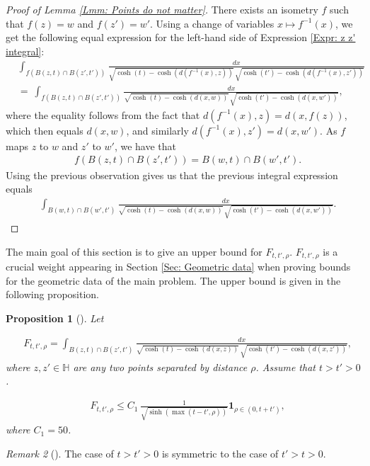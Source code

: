 \documentclass[11pt,twoside,reqno]{amsart} \usepackage{a4wide} \usepackage[T1]{fontenc} \usepackage[utf8]{inputenc} \usepackage{soul}  \usepackage{amsmath} \usepackage{amsfonts} \usepackage{amssymb} \usepackage{mathtools} \usepackage{amsthm} \usepackage{xcolor} \usepackage{graphicx} \usepackage{hyperref} \usepackage{standalone} \usepackage{esint} \usepackage{comment} \usepackage[left=2.3cm,top=3cm,right=2.3cm]{geometry} \usepackage{bm} \usepackage{svg} \usepackage{float} \numberwithin{equation}{section} \theoremstyle{plain} \newtheorem{thm}{Theorem}[section] \newtheorem{theorem}[thm]{Theorem} \newtheorem*{theorem*}{Theorem}\newtheorem{conj}[thm]{Conjecture} \newtheorem{lemma}[thm]{Lemma} \newtheorem{prop}[thm]{Proposition} \newtheorem{proposition}[thm]{Proposition} \newtheorem{cor}[thm]{Corollary} \newtheorem{question}[thm]{Question} \newtheorem{corollary}[thm]{Corollary} \newtheorem{assumption}[thm]{Assumption} \theoremstyle{definition} \newtheorem{defn}[thm]{Definition} \newtheorem{choice}[thm]{Choice} \newtheorem{definition}[thm]{Definition} \newtheorem{ex}[thm]{Example} \newtheorem{notation}[thm]{Notation} \newtheorem*{ack}{Acknowledgements} \theoremstyle{remark} \newtheorem{remark}[thm]{Remark} \newtheorem{bigremark}[thm]{Remark} \usepackage{xcolor} \newcommand{\red}[1]{ {\color{Red}#1} } \newcommand{\blue}[1]{ {\color{Blue}#1} } \author{Kai Hippi} \address{Aalto University, Espoo, Finland} \email{kai.hippi@aalto.fi}
\begin{document}
\begin{proof}[Proof of Lemma \ref{Lmm: Points do not matter}]

	There exists an isometry $ f $ such that $ f( z) = w $ and $ f( z' ) = w' $. Using a change of variables $ x \mapsto f^{-1}( x ) $, we get the following equal expression for the left-hand side of Expression \eqref{Expr: z z' integral}:
	\begin{align*}
		&
		\int_{ f\left( B( z,t ) \cap B( z',t' ) \right) } \frac{dx}{ \sqrt{ \cosh( t ) - \cosh( d( f^{-1}( x ), z ) ) } \, \sqrt{ \cosh( t' ) - \cosh( d( f^{-1}( x ), z' ) ) } }
		\\
		& = \
		\int_{ f\left( B( z,t ) \cap B( z',t' ) \right) } \frac{dx}{ \sqrt{ \cosh( t ) - \cosh( d( x, w ) ) } \, \sqrt{ \cosh( t' ) - \cosh( d( x, w' ) ) } },
	\end{align*}
	where the equality follows from the fact that $ d( f^{-1}( x ),z ) =  d( x, f( z ) ) $, which then equals $ d( x, w ) $, and similarly $ d( f^{-1}( x ),z' ) = d( x, w' ) $. As $ f $ maps $ z $ to $ w $ and $ z' $ to $ w' $, we have that
	\begin{align*}
		&
		f\left( B( z,t ) \cap B( z', t' ) \right) = B( w,t ) \cap B( w',t' ).
	\end{align*}
	Using the previous observation gives us that the previous integral expression equals
	\begin{align*}
		&
		\int_{ B( w,t ) \cap B( w', t' ) } \frac{dx}{ \sqrt{ \cosh( t ) - \cosh( d( x,w ) )  } \, \sqrt{ \cosh( t' ) - \cosh( d( x,w' ) ) } }.
	\end{align*}
	

\end{proof}


The main goal of this section is to give an upper bound for $ F_{t,t',\rho} $. $ F_{t,t',\rho} $ is a crucial weight appearing in Section \ref{Sec: Geometric data} when proving bounds for the geometric data of the main problem. The upper bound is given in the following proposition.

\begin{proposition}[]
	

	Let
	
	\begin{align*}
		&
		F_{t,t',\rho} = \int_{ B( z,t ) \cap B( z', t' ) } \frac{dx}{ \sqrt{ \cosh( t ) - \cosh( d( x,z ) )  } \, \sqrt{ \cosh( t' ) - \cosh( d( x,z' ) ) } },
\end{align*}
where $ z,z' \in \mathbb{H} $ are any two points separated by distance $ \rho $. Assume that $ t > t' > 0 $.
	
	\label{Prp: Weight function}
\begin{align*}
	&
	F_{t,t',\rho} \leq C_{1}  \, \frac{1}{\sqrt{ \sinh( \max( t-t', \rho ) ) }} \boldsymbol 1_{ \rho \in ( 0, t + t' ) },
\end{align*}
where $C_{1} = 50$.

\end{proposition}
\begin{remark}[]
	
	The case of $ t > t' > 0 $ is symmetric to the case of $ t' > t > 0 $. 

\end{remark}
\end{document}
